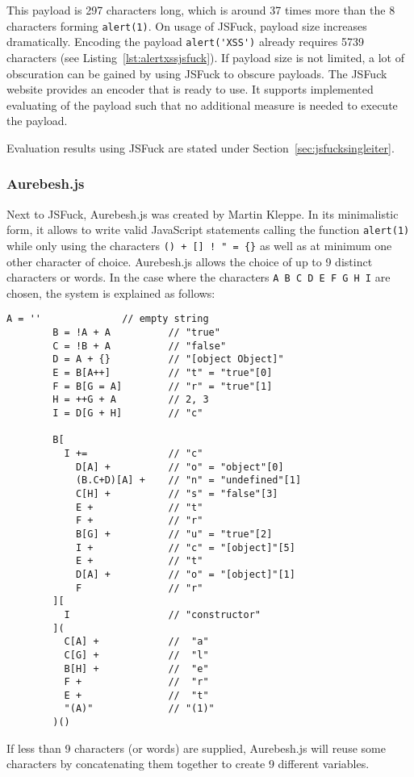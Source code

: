 This payload is 297 characters long, which is around 37 times more than the 8 characters forming \verb|alert(1)|. On usage of JSFuck, payload size increases dramatically. Encoding the payload \verb|alert('XSS')| already requires 5739 characters (see Listing~\ref{lst:alertxssjsfuck}). If payload size is not limited, a lot of obscuration can be gained by using JSFuck to obscure payloads. The JSFuck website provides an encoder that is ready to use. It supports implemented evaluating of the payload such that no additional measure is needed to execute the payload. \cite{mk/jsfuck}

Evaluation results using JSFuck are stated under Section~\ref{sec:jsfucksingleiter}.

\subsubsection{Aurebesh.js}
\label{sec:aurebesh}
Next to JSFuck, Aurebesh.js was created by Martin Kleppe. In its minimalistic form, it allows to write valid JavaScript statements calling the function \verb|alert(1)| while only using the characters \verb|() + [] ! " = {}| as well as at minimum one other character of choice. Aurebesh.js allows the choice of up to 9 distinct characters or words. In the case where the characters \verb|A B C D E F G H I| are chosen, the system is explained as follows:
\begin{lstlisting}[style=basicStyle, caption=Aurebesh.js explanation \cite{mk/aurebesh}, label={lst:aurebeshexplanation}]
		A = ''              // empty string
		B = !A + A          // "true"
		C = !B + A          // "false"
		D = A + {}          // "[object Object]"
		E = B[A++]          // "t" = "true"[0]
		F = B[G = A]        // "r" = "true"[1]
		H = ++G + A         // 2, 3
		I = D[G + H]        // "c"

		B[
		  I +=              // "c"
		    D[A] +          // "o" = "object"[0]
		    (B.C+D)[A] +    // "n" = "undefined"[1]
		    C[H] +          // "s" = "false"[3]
		    E +             // "t"
		    F +             // "r"
		    B[G] +          // "u" = "true"[2]
		    I +             // "c" = "[object]"[5]
		    E +             // "t"
		    D[A] +          // "o" = "[object]"[1]
		    F               // "r"
		][
		  I                 // "constructor"
		](
		  C[A] +            //  "a"
		  C[G] +            //  "l"
		  B[H] +            //  "e"
		  F +               //  "r"
		  E +               //  "t"
		  "(A)"             // "(1)"
		)()
\end{lstlisting}
If less than 9 characters (or words) are supplied, Aurebesh.js will reuse some characters by concatenating them together to create 9 different variables. \cite{mk/aurebesh}

